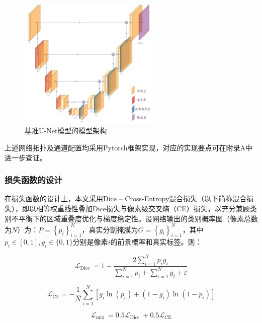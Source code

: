 \begin{figure}[htbp]
    \centering
    \includegraphics[width=0.6\textwidth]{fig/Unet_ushape.png}
    \caption{基准U-Net模型的模型架构}
    \label{fig:unet_ushape}
\end{figure}

上述网络拓扑及通道配置均采用Pytorch框架实现，对应的实现要点可在附录A中进一步查证。

\subsubsection{损失函数的设计}

在损失函数的设计上，本文采用Dice – Cross-Entropy混合损失（以下简称混合损失），即以相等权重线性叠加Dice损失与像素级交叉熵（CE）损失，以充分兼顾类别不平衡下的区域重叠度优化与梯度稳定性。设网络输出的类别概率图（像素总数为$N$）为：$ P=\left\{p_{i}\right\}_{i=1}^{N} $，真实分割掩膜为$ G=\left\{g_{i}\right\}_{i=1}^{N} $，其中$ p_{i} \in[0,1], g_{i} \in\{0,1\}$分别是像素$i$的前景概率和真实标签。则：

\begin{equation}
    \mathcal{L}_{\text {Dice }}=1-\frac{2 \sum_{i=1}^{N} p_{i} g_{i}}{\sum_{i=1}^{N} p_{i}+\sum_{i=1}^{N} g_{i}+\varepsilon}
\end{equation}

\begin{equation}
    \mathcal{L}_{\mathrm{CE}}=-\frac{1}{N} \sum_{i=1}^{N}\left[g_{i} \ln \left(p_{i}\right)+\left(1-g_{i}\right) \ln \left(1-p_{i}\right)\right]
\end{equation}

\begin{equation}
    \mathcal{L}_{\text {mix }}=0.5 \mathcal{L}_{\text {Dice }}+0.5 \mathcal{L}_{\mathrm{CE}}
\end{equation}

